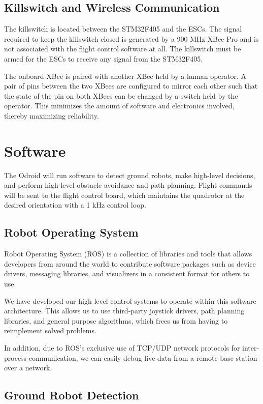 \documentclass[12pt,letterpaper]{article} \usepackage[margin=1in]{geometry}
\begin{document}
\subsection*{Killswitch and Wireless Communication}

The killswitch is located between the STM32F405 and the ESCs. The signal
required to keep the killswitch closed is generated by a 900 MHz XBee Pro and is
not associated with the flight control software at all. The killswitch must be
armed for the ESCs to receive any signal from the STM32F405.

The onboard XBee is paired with another XBee held by a human operator. A pair
of pins between the two XBees are configured to mirror each other such that the
state of the pin on both XBees can be changed by a switch held by the operator.
This minimizes the amount of software and electronics involved, thereby
maximizing reliability.


\section*{Software}

The Odroid will run software to detect ground robots, make high-level
decisions, and perform high-level obstacle avoidance and path planning. Flight
commands will be sent to the flight control board, which maintains the
quadrotor at the desired orientation with a 1 kHz control loop.


\subsection*{Robot Operating System}

Robot Operating System (ROS) is a collection of libraries and tools that allows
developers from around the world to contribute software packages such as device
drivers, messaging libraries, and visualizers in a consistent format for others
to use.

We have developed our high-level control systems to operate within this
software architecture. This allows us to use third-party joystick drivers, path
planning libraries, and general purpose algorithms, which frees us from having
to reimplement solved problems.

In addition, due to ROS's exclusive use of TCP/UDP network protocols for
inter-process communication, we can easily debug live data from a remote base
station over a network.


\subsection*{Ground Robot Detection}
\end{document}
